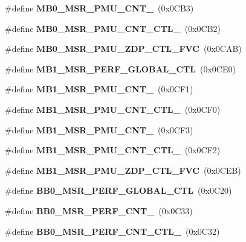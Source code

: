 \begin{DoxyCompactItemize}
\item 
\mbox{\label{types_8h_a0df6e3fab87e53401d50c45c4555974c}} 
\#define {\bfseries M\+B0\+\_\+\+M\+S\+R\+\_\+\+P\+M\+U\+\_\+\+C\+N\+T\+\_}~(0x0\+C\+B3)
\item 
\mbox{\label{types_8h_ae39dc86d20e7a32716317b09034a3f15}} 
\#define {\bfseries M\+B0\+\_\+\+M\+S\+R\+\_\+\+P\+M\+U\+\_\+\+C\+N\+T\+\_\+\+C\+T\+L\+\_}~(0x0\+C\+B2)
\item 
\mbox{\label{types_8h_a53e14a771731731a3f3a860c4eef80f7}} 
\#define {\bfseries M\+B0\+\_\+\+M\+S\+R\+\_\+\+P\+M\+U\+\_\+\+Z\+D\+P\+\_\+\+C\+T\+L\+\_\+\+F\+VC}~(0x0\+C\+A\+B)
\item 
\mbox{\label{types_8h_a8aaf763a5f24ae67e344355e5e29b1d9}} 
\#define {\bfseries M\+B1\+\_\+\+M\+S\+R\+\_\+\+P\+E\+R\+F\+\_\+\+G\+L\+O\+B\+A\+L\+\_\+\+C\+TL}~(0x0\+C\+E0)
\item 
\mbox{\label{types_8h_a81d488eaa84dfb353d4efcf2b1e20081}} 
\#define {\bfseries M\+B1\+\_\+\+M\+S\+R\+\_\+\+P\+M\+U\+\_\+\+C\+N\+T\+\_}~(0x0\+C\+F1)
\item 
\mbox{\label{types_8h_a3b528747d7aa55a42ec7e67955157d44}} 
\#define {\bfseries M\+B1\+\_\+\+M\+S\+R\+\_\+\+P\+M\+U\+\_\+\+C\+N\+T\+\_\+\+C\+T\+L\+\_}~(0x0\+C\+F0)
\item 
\mbox{\label{types_8h_add7e5a997296911b1eeef0d72990217e}} 
\#define {\bfseries M\+B1\+\_\+\+M\+S\+R\+\_\+\+P\+M\+U\+\_\+\+C\+N\+T\+\_}~(0x0\+C\+F3)
\item 
\mbox{\label{types_8h_a5d10d73c3cadef48250f288b4deae7f4}} 
\#define {\bfseries M\+B1\+\_\+\+M\+S\+R\+\_\+\+P\+M\+U\+\_\+\+C\+N\+T\+\_\+\+C\+T\+L\+\_}~(0x0\+C\+F2)
\item 
\mbox{\label{types_8h_a3dc9c0af51020d80f04cd959628a6fe4}} 
\#define {\bfseries M\+B1\+\_\+\+M\+S\+R\+\_\+\+P\+M\+U\+\_\+\+Z\+D\+P\+\_\+\+C\+T\+L\+\_\+\+F\+VC}~(0x0\+C\+E\+B)
\item 
\mbox{\label{types_8h_a96724c63333fd75d0b4f6df6f15c00cc}} 
\#define {\bfseries B\+B0\+\_\+\+M\+S\+R\+\_\+\+P\+E\+R\+F\+\_\+\+G\+L\+O\+B\+A\+L\+\_\+\+C\+TL}~(0x0\+C20)
\item 
\mbox{\label{types_8h_a4b97b6b3bcbaff8c0b586f39950c6843}} 
\#define {\bfseries B\+B0\+\_\+\+M\+S\+R\+\_\+\+P\+E\+R\+F\+\_\+\+C\+N\+T\+\_}~(0x0\+C33)
\item 
\mbox{\label{types_8h_a25fee148c332891795513f9b1a05cffa}} 
\#define {\bfseries B\+B0\+\_\+\+M\+S\+R\+\_\+\+P\+E\+R\+F\+\_\+\+C\+N\+T\+\_\+\+C\+T\+L\+\_}~(0x0\+C32)
\item 
\mbox{\label{types_8h_aabcec1d26741254e752a93e1804ff3b5}} 

\end{DoxyCompactItemize}
